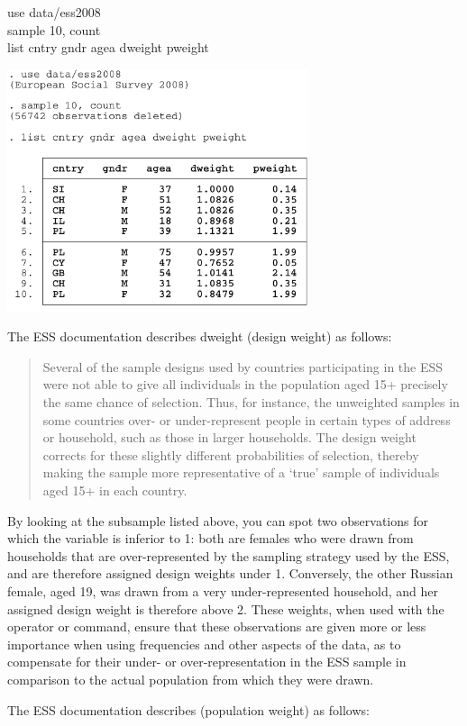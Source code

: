 \begin{docspec}
  use data/ess2008 \\
  sample 10, count \\
  list cntry gndr agea dweight pweight
\end{docspec}

\includegraphics[width=250pt]{images/ess-sample.pdf}

The ESS documentation describes dweight (design weight) as follows:
\blockquote{Several of the sample designs used by countries participating in the ESS were not able to give all individuals in the population aged 15+ precisely the same chance of selection. Thus, for instance, the unweighted samples in some countries over- or under-represent people in certain types of address or household, such as those in larger households. The design weight corrects for these slightly different probabilities of selection, thereby making the sample more representative of a ‘true’ sample of individuals aged 15+ in each country.}
By looking at the subsample listed above, you can spot two observations for which the  variable is inferior to 1: both are females who were drawn from households that are over-represented by the sampling strategy used by the ESS, and are therefore assigned design weights under 1. Conversely, the other Russian female, aged 19, was drawn from a very under-represented household, and her assigned design weight is therefore above 2. These weights, when used with the \cmd{[weight]} operator or  command, ensure that these observations are given more or less importance when using frequencies and other aspects of the data, as to compensate for their under- or over-representation in the ESS sample in comparison to the actual population from which they were drawn.

The ESS documentation describes  (population weight) as follows:

